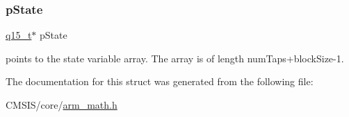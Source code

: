 \subsubsection{\texorpdfstring{pState}{pState}}
{\footnotesize\ttfamily \mbox{\hyperlink{arm__math_8h_ab5a8fb21a5b3b983d5f54f31614052ea}{q15\+\_\+t}}$\ast$ p\+State}

points to the state variable array. The array is of length num\+Taps+block\+Size-\/1. 

The documentation for this struct was generated from the following file\+:\begin{DoxyCompactItemize}
\item 
C\+M\+S\+I\+S/core/\mbox{\hyperlink{arm__math_8h}{arm\+\_\+math.\+h}}\end{DoxyCompactItemize}
